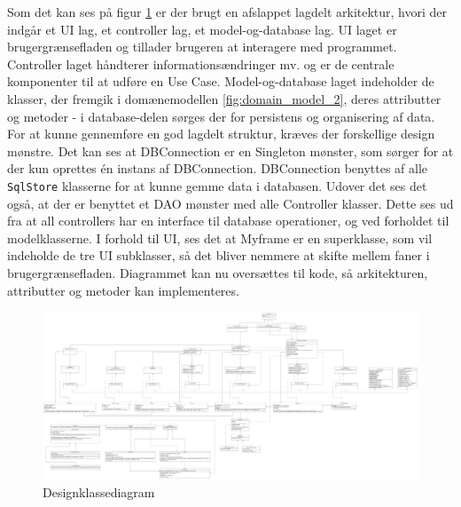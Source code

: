Som det kan ses på figur \ref{fig:designclassdiagram} er der brugt en afslappet lagdelt arkitektur, hvori der indgår et UI lag, et controller lag, et model-og-database lag\cite{Larman2004}. UI laget er brugergrænsefladen og tillader brugeren at interagere med programmet. Controller laget håndterer informationsændringer mv. og er de centrale komponenter til at udføre en Use Case. Model-og-database laget indeholder de klasser, der fremgik i domænemodellen \ref{fig:domain_model_2}, deres attributter og metoder - i database-delen sørges der for persistens og organisering af data. 
For at kunne gennemføre en god lagdelt struktur, kræves der forskellige design mønstre. Det kan ses at DBConnection er en Singleton mønster\cite{Larman2004}, som sørger for at der kun oprettes én instans af DBConnection. DBConnection benyttes af alle \verb|SqlStore| klasserne for at kunne gemme data i databasen. Udover det ses det også, at der er benyttet et DAO mønster\cite{DAO} med alle Controller klasser. Dette ses ud fra at all controllers har en interface til database operationer, og ved forholdet til modelklasserne.
I forhold til UI, ses det at Myframe er en superklasse, som vil indeholde de tre UI subklasser, så det bliver nemmere at skifte mellem faner i brugergrænsefladen.
Diagrammet kan nu oversættes til kode, så arkitekturen, attributter og metoder kan implementeres.

\begin{landscape}
    \begin{figure}
        \centering
        \includegraphics[width=1\hsize]{figures/design/new_designclassdiagram}
        \caption{Designklassediagram}
        \label{fig:designclassdiagram}
    \end{figure}
\end{landscape}

